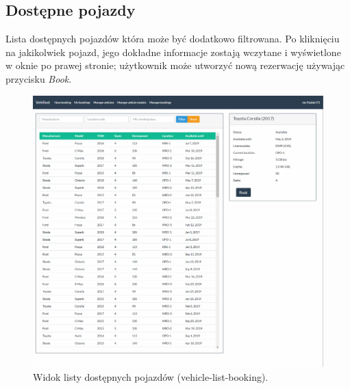 \documentclass[eng,printmode,openany]{mgr}
\begin{document}
\begin{appendices}
		\section{Dostępne pojazdy}
		Lista dostępnych pojazdów która może być dodatkowo filtrowana. Po kliknięciu na jakikolwiek pojazd, jego dokładne informacje zostają wczytane i wyświetlone w oknie po prawej stronie; użytkownik może utworzyć nową rezerwację używając przycisku \textit{Book}.
		\begin{figure}[H]
			\centering
			\includegraphics[width=\textwidth]{images/views/vehicle-booking-2.png}
			\caption{Widok listy dostępnych pojazdów (vehicle-list-booking).}
		\end{figure}
		
		\newpage

\end{appendices}
\end{document}
